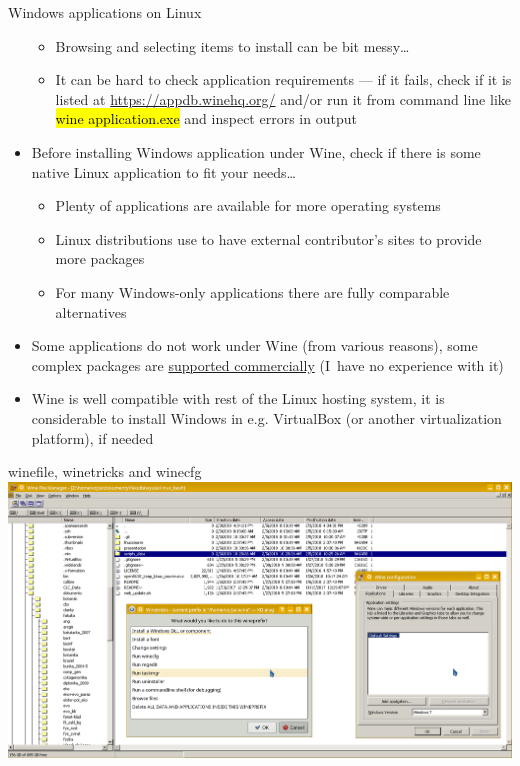 \documentclass[compress, ucs, xelatex, 11pt, xcolor=svgnames,
  hyperref={
    bookmarks=true,
    unicode=true,
    colorlinks=true,
    pdftitle={Linux, command line and MetaCentrum},
    plainpages=false,
    pdfauthor={Vojtech Zeisek},
    pdfsubject={Course about use of Linux command line, writing shell scripts and using MetaCentrum of CESNET},
    pdfcreator={XeLaTeX},
    pdfkeywords={Linux, GNU, BASH, shell, command line, MetaCentrum},
    linkcolor=DarkRed,
    anchorcolor=DarkBlue,
    citecolor=Indigo,
    filecolor=NavyBlue,
    menucolor=DarkMagenta,
    urlcolor=DarkBlue,
    pdftex},
  url={hyphens, lowtilde} %
  ]{beamer}
\renewcommand{\texttt}[1]{\hl{\ttfamily #1}}
\begin{document}
\begin{frame}[allowframebreaks]{Windows applications on Linux}
\begin{itemize}
\begin{itemize}
      \item Browsing and selecting items to install can be bit messy\ldots
      \item It can be hard to check application requirements --- if it fails, check if it is listed at \url{https://appdb.winehq.org/} and/or run it from command line like \texttt{wine application.exe} and inspect errors in output
    \end{itemize}
    \item Before installing Windows application under Wine, check if there is some native Linux application to fit your needs\ldots
    \begin{itemize}
      \item Plenty of applications are available for more operating systems
      \item Linux distributions use to have external contributor's sites to provide more packages
      \item For many Windows-only applications there are fully comparable alternatives
    \end{itemize}
    \item Some applications do not work under Wine (from various reasons), some complex packages are \href{https://www.codeweavers.com/}{supported commercially} (I~have no experience with it)
    \item Wine is well compatible with rest of the Linux hosting system, it is considerable to install Windows in e.g. VirtualBox (or another virtualization platform), if needed
  \end{itemize}
\end{frame}

\begin{frame}{winefile, winetricks and winecfg}
  \includegraphics[width=\textwidth]{wine.png}
\end{frame}
\end{document}
